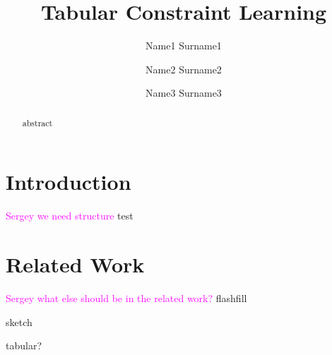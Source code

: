 \documentclass{ecai}
\newcommand{\sergey}[1]{\textcolor{magenta}{{\sc Sergey} #1}\xspace}
\begin{document}
\title{Tabular Constraint Learning}

\author{Name1 Surname1 \and Name2 Surname2 \and Name3 Surname3  }

\maketitle


\begin{abstract}
  abstract
  \end{abstract}
\section{Introduction}
\sergey{we need structure} test

\section{Related Work}
\sergey{what else should be in the related work?}
flashfill

sketch

tabular?


\end{document}
